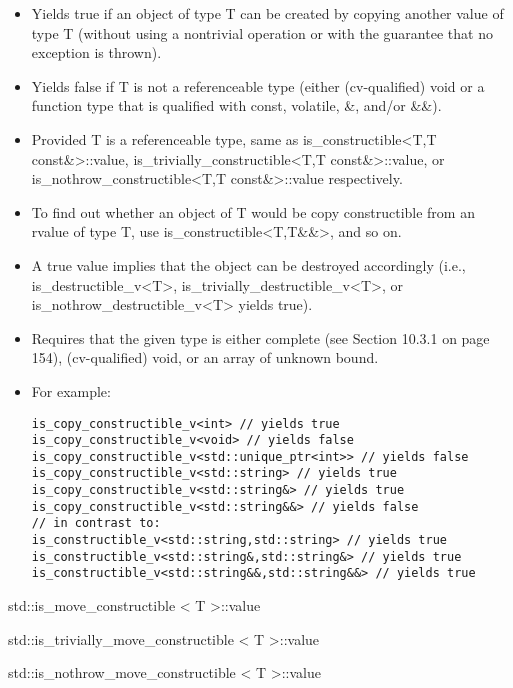 \begin{itemize}
\item 
Yields true if an object of type T can be created by copying another value of type T (without using a nontrivial operation or with the guarantee that no exception is thrown).

\item 
Yields false if T is not a referenceable type (either (cv-qualified) void or a function type that is qualified with const, volatile, \&, and/or \&\&).

\item 
Provided T is a referenceable type, same as is\_constructible<T,T const\&>::value, is\_trivially\_constructible<T,T const\&>::value, or is\_nothrow\_constructible<T,T const\&>::value respectively.

\item 
To find out whether an object of T would be copy constructible from an rvalue of type T, use is\_constructible<T,T\&\&>, and so on.

\item 
A true value implies that the object can be destroyed accordingly (i.e., is\_destructible\_v<T>, is\_trivially\_destructible\_v<T>, or is\_nothrow\_destructible\_v<T> yields true).

\item 
Requires that the given type is either complete (see Section 10.3.1 on page 154), (cv-qualified) void, or an array of unknown bound.

\item 
For example:
\begin{lstlisting}[style=styleCXX]
is_copy_constructible_v<int> // yields true
is_copy_constructible_v<void> // yields false
is_copy_constructible_v<std::unique_ptr<int>> // yields false
is_copy_constructible_v<std::string> // yields true
is_copy_constructible_v<std::string&> // yields true
is_copy_constructible_v<std::string&&> // yields false
// in contrast to:
is_constructible_v<std::string,std::string> // yields true
is_constructible_v<std::string&,std::string&> // yields true
is_constructible_v<std::string&&,std::string&&> // yields true
\end{lstlisting}

\end{itemize}

std::is\_move\_constructible < T >::value

std::is\_trivially\_move\_constructible < T >::value

std::is\_nothrow\_move\_constructible < T >::value

